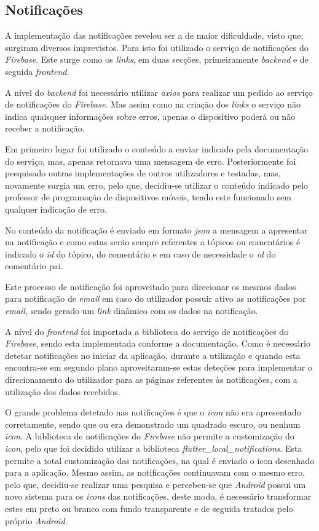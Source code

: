 \subsection{Notificações}

A implementação das notificações revelou ser a de maior dificuldade, visto que, surgiram diversos imprevistos. Para isto foi utilizado o serviço de notificações do \textit{Firebase}. Este surge como os \textit{links}, em duas secções, primeiramente \textit{backend} e de seguida \textit{frontend}.

A nível do \textit{backend} foi necessário utilizar \textit{axios} para realizar um pedido ao serviço de notificações do \textit{Firebase}. Mas assim como na criação dos \textit{links} o serviço não indica quaisquer informações sobre erros, apenas o dispositivo poderá ou não receber a notificação. 

Em primeiro lugar foi utilizado o conteúdo a enviar indicado pela documentação do serviço, mas, apenas retornava uma mensagem de erro. Posteriormente foi pesquisado outras implementações de outros utilizadores e testadas, mas, novamente surgia um erro, pelo que, decidiu-se utilizar o conteúdo indicado pelo professor de programação de dispositivos móveis, tendo este funcionado sem qualquer indicação de erro. 

No conteúdo da notificação é enviado em formato \textit{json} a mensagem a apresentar na notificação e como estas serão sempre referentes a tópicos ou comentários é indicado o \textit{id} do tópico, do comentário e em caso de necessidade o \textit{id} do comentário pai.

Este processo de notificação foi aproveitado para direcionar os mesmos dados para notificação de \textit{email} em caso do utilizador possuir ativo as notificações por \textit{email}, sendo gerado um \textit{link} dinâmico com os dados na notificação.

A nível do \textit{frontend} foi importada a biblioteca do serviço de notificações do \textit{Firebase}, sendo esta implementada conforme a documentação. Como é necessário detetar notificações no iniciar da aplicação, durante a utilização e quando esta encontra-se em segundo plano aproveitaram-se estas deteções para implementar o direcionamento do utilizador para as páginas referentes às notificações, com a utilização dos dados recebidos.

O grande problema detetado nas notificações é que o \textit{icon} não era apresentado corretamente, sendo que ou era demonstrado um quadrado escuro, ou nenhum \textit{icon}. A biblioteca de notificações do \textit{Firebase} não permite a customização do \textit{icon}, pelo que foi decidido utilizar a biblioteca \textit{flutter\_local\_notifications}. Esta permite a total customização das notificações, na qual é enviado o icon desenhado para a aplicação. Mesmo assim, as notificações continuavam com o mesmo erro, pelo que, decidiu-se realizar uma pesquisa e percebeu-se que \textit{Android} possui um novo sistema para os \textit{icons} das notificações, deste modo, é necessário transformar estes em preto ou branco com fundo transparente e de seguida tratados pelo próprio \textit{Android}.


